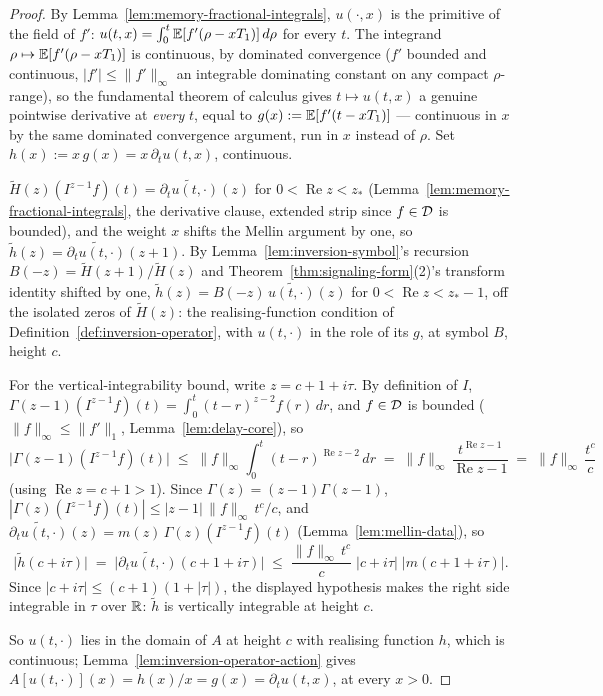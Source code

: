 \begin{proof}
By Lemma~\ref{lem:memory-fractional-integrals}, $u(\cdot,x)$ is the primitive of the field of
$f'$: $u(t,x) = \int_0^t \mathbb{E}[f'(\rho - xT_1)]\,d\rho$ for every $t$. The integrand
$\rho \mapsto \mathbb{E}[f'(\rho-xT_1)]$ is continuous, by dominated convergence ($f'$ bounded and
continuous, $|f'| \le \|f'\|_\infty$ an integrable dominating constant on any compact
$\rho$-range), so the fundamental theorem of calculus gives $t \mapsto u(t,x)$ a genuine pointwise
derivative at \emph{every} $t$, equal to $g(x) := \mathbb{E}[f'(t-xT_1)]$ --- continuous in $x$ by the
same dominated convergence argument, run in $x$ instead of $\rho$. Set
$h(x) := x\,g(x) = x\,\partial_t u(t,x)$, continuous.

$\tilde H(z)(I^{z-1}f)(t) = \widetilde{\partial_t u(t,\cdot)}(z)$ for $0 < \operatorname{Re} z < z_*$
(Lemma~\ref{lem:memory-fractional-integrals}, the derivative clause, extended strip since
$f \in \mathcal{D}$ is bounded), and the weight $x$ shifts the Mellin argument by one, so
$\tilde h(z) = \widetilde{\partial_t u(t,\cdot)}(z+1)$. By Lemma~\ref{lem:inversion-symbol}'s
recursion $B(-z) = \tilde H(z+1)/\tilde H(z)$ and Theorem~\ref{thm:signaling-form}(2)'s transform
identity shifted by one, $\tilde h(z) = B(-z)\,\widetilde{u(t,\cdot)}(z)$ for
$0 < \operatorname{Re} z < z_*-1$, off the isolated zeros of $\tilde H(z)$: the realising-function condition
of Definition~\ref{def:inversion-operator}, with $u(t,\cdot)$ in the role of its $g$, at symbol
$B$, height $c$.

For the vertical-integrability bound, write $z = c+1+i\tau$. By definition of $I$,
$\Gamma(z-1)(I^{z-1}f)(t) = \int_0^t (t-r)^{z-2}f(r)\,dr$, and $f \in \mathcal{D}$ is bounded
($\|f\|_\infty \le \|f'\|_1$, Lemma~\ref{lem:delay-core}), so
\[
\bigl|\Gamma(z-1)(I^{z-1}f)(t)\bigr| \;\le\; \|f\|_\infty \int_0^t (t-r)^{\operatorname{Re} z - 2}\,dr
\;=\; \|f\|_\infty\,\frac{t^{\operatorname{Re} z - 1}}{\operatorname{Re} z - 1} \;=\; \|f\|_\infty\,\frac{t^{c}}{c}
\]
(using $\operatorname{Re} z = c+1 > 1$). Since $\Gamma(z) = (z-1)\Gamma(z-1)$,
$|\Gamma(z)(I^{z-1}f)(t)| \le |z-1|\,\|f\|_\infty\,t^c/c$, and
$\widetilde{\partial_t u(t,\cdot)}(z) = m(z)\,\Gamma(z)(I^{z-1}f)(t)$
(Lemma~\ref{lem:mellin-data}), so
\[
\bigl|\tilde h(c+i\tau)\bigr| \;=\; \bigl|\widetilde{\partial_t u(t,\cdot)}(c+1+i\tau)\bigr|
\;\le\; \frac{\|f\|_\infty\,t^c}{c}\;|c+i\tau|\;\bigl|m(c+1+i\tau)\bigr|.
\]
Since $|c+i\tau| \le (c+1)(1+|\tau|)$, the displayed hypothesis makes the right side integrable in
$\tau$ over $\mathbb{R}$: $\tilde h$ is vertically integrable at height $c$.

So $u(t,\cdot)$ lies in the domain of $A$ at height $c$ with realising function $h$, which is
continuous; Lemma~\ref{lem:inversion-operator-action} gives
$A[u(t,\cdot)](x) = h(x)/x = g(x) = \partial_t u(t,x)$, at every $x > 0$.
\end{proof}

